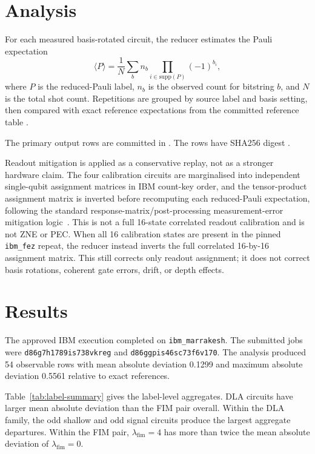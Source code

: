 \documentclass[preprint,aps,physrev,superscriptaddress,floatfix,longbibliography]{revtex4-2}
\begin{document}
\section{Analysis}

For each measured basis-rotated circuit, the reducer estimates the Pauli
expectation
\begin{equation}
  \langle P \rangle =
  \frac{1}{N}\sum_b n_b
  \prod_{i\in \mathrm{supp}(P)} (-1)^{b_i},
\end{equation}
where $P$ is the reduced-Pauli label, $n_b$ is the observed count for bitstring
$b$, and $N$ is the total shot count. Repetitions are grouped by source label
and basis setting, then compared with exact reference expectations from the
committed reference table
.

The primary output rows are committed in
.
The rows have SHA256 digest
.

Readout mitigation is applied as a conservative replay, not as a stronger
hardware claim. The four calibration circuits are marginalised into independent
single-qubit assignment matrices in IBM count-key order, and the tensor-product
assignment matrix is inverted before recomputing each reduced-Pauli
expectation, following the standard response-matrix/post-processing
measurement-error mitigation logic~\cite{Maciejewski2020}. This is not a full
16-state correlated readout calibration and is not ZNE or PEC. When all 16
calibration states are present in the pinned
\texttt{ibm\_fez} repeat, the reducer instead inverts the full correlated
16-by-16 assignment matrix. This still corrects only readout assignment; it
does not correct basis rotations, coherent gate errors, drift, or depth
effects.

\section{Results}

The approved IBM execution completed on \texttt{ibm\_marrakesh}. The submitted
jobs were \texttt{d86g7h1789is738vkreg} and
\texttt{d86ggpis46sc73f6v170}. The analysis produced 54 observable rows with
mean absolute deviation 0.1299 and maximum absolute deviation 0.5561 relative
to exact references.

Table~\ref{tab:label-summary} gives the label-level aggregates. DLA circuits
have larger mean absolute deviation than the FIM pair overall. Within the DLA
family, the odd shallow and odd signal circuits produce the largest aggregate
departures. Within the FIM pair, $\lambda_{\mathrm{fim}}=4$ has more than twice
the mean absolute deviation of $\lambda_{\mathrm{fim}}=0$.
\end{document}
